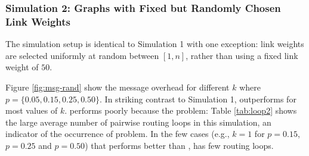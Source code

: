 


\subsubsection{Simulation 2: \er Graphs with Fixed but Randomly Chosen Link Weights}
\label{subsec:expt2}


The simulation setup is identical to Simulation 1 with one exception: link weights are selected uniformly at random between $[1,n]$, rather than using a
fixed link weight of $50$.

Figure \ref{fig:msg-rand} show the message overhead for different $k$ where $p=\{0.05,0.15,0.25,0.50 \}$. 
In striking contrast to Simulation 1, \purge outperforms \second for most values of $k$. 
\second performs poorly because the \infinity problem: Table \ref{tab:loop2} shows the large average number of pairwise routing loops in this simulation, 
an indicator of the occurrence of \infinity problem.
In the few cases (e.g., $k=1$ for $p=0.15$, $p=0.25$ and $p=0.50$) that \second performs better than \purges, \second has few routing loops.

